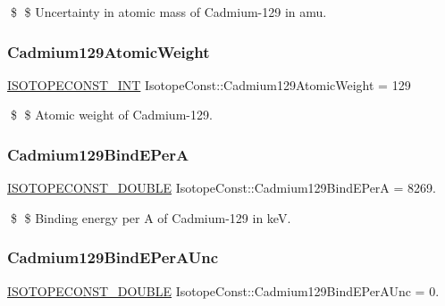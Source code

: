 \$ \$ Uncertainty in atomic mass of Cadmium-\/129 in amu. \mbox{\label{group___isotope_const-_cadmium-_cd129_gaa3d36444f0eaf5145e1f515fbec75652}} 
\subsubsection{\texorpdfstring{Cadmium129\+Atomic\+Weight}{Cadmium129AtomicWeight}}
{\footnotesize\ttfamily \mbox{\hyperlink{group___isotope_const-_macros_ga5f18360b3e99483a35c32d789e62621c}{I\+S\+O\+T\+O\+P\+E\+C\+O\+N\+S\+T\+\_\+\+I\+NT}} Isotope\+Const\+::\+Cadmium129\+Atomic\+Weight = 129}

\$ \$ Atomic weight of Cadmium-\/129. \mbox{\label{group___isotope_const-_cadmium-_cd129_ga64407ac7e4d86da5b045a0d060c12b59}} 
\subsubsection{\texorpdfstring{Cadmium129\+Bind\+E\+PerA}{Cadmium129BindEPerA}}
{\footnotesize\ttfamily \mbox{\hyperlink{group___isotope_const-_macros_ga8f45a7272ce02c0b4c65c44636ed719a}{I\+S\+O\+T\+O\+P\+E\+C\+O\+N\+S\+T\+\_\+\+D\+O\+U\+B\+LE}} Isotope\+Const\+::\+Cadmium129\+Bind\+E\+PerA = 8269.}

\$ \$ Binding energy per A of Cadmium-\/129 in keV. \mbox{\label{group___isotope_const-_cadmium-_cd129_ga6914ce7d08f7eb278c8157c8dc739ba0}} 
\subsubsection{\texorpdfstring{Cadmium129\+Bind\+E\+Per\+A\+Unc}{Cadmium129BindEPerAUnc}}
{\footnotesize\ttfamily \mbox{\hyperlink{group___isotope_const-_macros_ga8f45a7272ce02c0b4c65c44636ed719a}{I\+S\+O\+T\+O\+P\+E\+C\+O\+N\+S\+T\+\_\+\+D\+O\+U\+B\+LE}} Isotope\+Const\+::\+Cadmium129\+Bind\+E\+Per\+A\+Unc = 0.}

